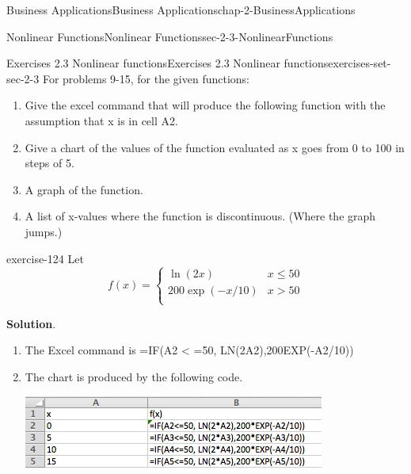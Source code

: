 \documentclass[oneside,10pt,]{book}
\numberwithin{equation}{section}
\newcommand{\gt}{>}
\begin{document}
\begin{chapterptx}{Business Applications}{}{Business Applications}{}{}{chap-2-BusinessApplications}
\begin{sectionptx}{Nonlinear Functions}{}{Nonlinear Functions}{}{}{sec-2-3-NonlinearFunctions}
\begin{exercises-subsection-numberless}{Exercises 2.3 Nonlinear functions}{}{Exercises 2.3 Nonlinear functions}{}{}{exercises-set-sec-2-3}
For problems 9-15, for the given functions:%
\leavevmode%
\begin{enumerate}[label=(\alph*)]
\item\hypertarget{li-236}{}\hypertarget{p-840}{}%
Give the excel command that will produce the following function with the assumption that x is in cell A2.%
\item\hypertarget{li-237}{}\hypertarget{p-841}{}%
Give a chart of the values of the function evaluated as x goes from 0 to 100 in steps of 5.%
\item\hypertarget{li-238}{}\hypertarget{p-842}{}%
A graph of the function.%
\item\hypertarget{li-239}{}\hypertarget{p-843}{}%
A list of x-values where the function is discontinuous.  (Where the graph jumps.)%
\end{enumerate}
\begin{exercisegroup}
\begin{divisionexerciseeg}{9}{}{}{exercise-124}%
\hypertarget{p-844}{}%
Let%
%
\begin{equation*}
f(x)=\begin{cases}
\ln(2x)&x \le 50\\
200\exp(-x/10)&x \gt 50\\
\end{cases}
\end{equation*}
\par\smallskip%
\noindent\textbf{Solution}.\hypertarget{solution-60}{}\quad%
\leavevmode%
\begin{enumerate}[label=(\alph*)]
\item\hypertarget{li-240}{}\hypertarget{p-845}{}%
The Excel command is =IF(A2 \textless{} =50, LN(2\textasteriskcentered{}A2),200\textasteriskcentered{}EXP(-A2\slash{}10))%
\item\hypertarget{li-241}{}\hypertarget{p-846}{}%
The chart is produced by the following code.%
\begin{sidebyside}{1}{0.2}{0.2}{0}%
\begin{sbspanel}{0.6}%
\includegraphics[width=1\linewidth]{images/sec2-3-sol9a.png}
\end{sbspanel}%
\end{sidebyside}%

\end{enumerate}
\end{divisionexerciseeg}
\end{exercisegroup}
\end{exercises-subsection-numberless}
\end{sectionptx}
\end{chapterptx}
\end{document}
